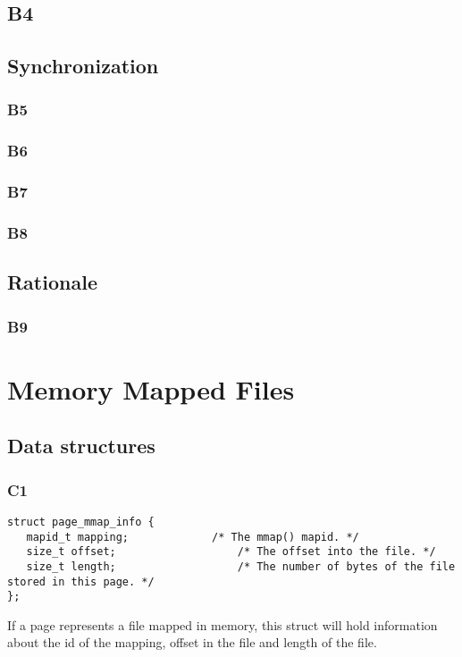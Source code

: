 \documentclass[a4wide, 11pt]{article}
\begin{document}
\subsection{B4}

\subsection{Synchronization}
\subsubsection{B5}

\subsubsection{B6}

\subsubsection{B7}

\subsubsection{B8}

\subsection{Rationale}
\subsubsection{B9}


\section{Memory Mapped Files}
\subsection{Data structures}
\subsubsection{C1}
\begin{verbatim}
struct page_mmap_info {
   mapid_t mapping;				/* The mmap() mapid. */
   size_t offset;					/* The offset into the file. */
   size_t length;					/* The number of bytes of the file stored in this page. */
};
\end{verbatim}
If a page represents a file mapped in memory, this struct will hold information about the id of the mapping, offset in the file and length of the file.
\end{document}
